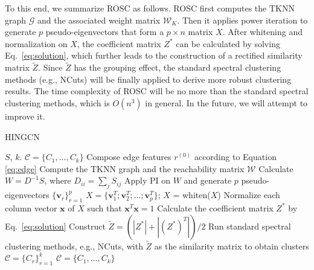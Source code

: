 To this end, we summarize ROSC as follows.
ROSC first computes the TKNN graph $\mathcal{G}$
and the associated weight matrix $\mathcal{W}_K$. Then it applies power iteration to generate $p$
pseudo-eigenvectors that form a $p \times n$ matrix $X$.
After whitening and normalization on $X$,
the coefficient matrix $Z^*$ can be calculated by solving Eq.~\ref{eq:solution},
which further leads to the construction of a rectified similarity matrix $\tilde{Z}$.
Since $\tilde{Z}$ has the grouping effect, 
the standard spectral clustering methods (e.g., NCuts) will be finally applied to derive more robust clustering results.
The time complexity of ROSC will be no more than the standard spectral clustering methods,
which is $O(n^3)$ in general.
In the future, we will attempt to improve it. 


\begin{algorithm}
\begin{small}
\caption{HINGCN}
\label{alg}
\begin{algorithmic}[1]
\Require $S$, $k$.
\Ensure $\mathcal{C} = \{C_1, ..., C_k\}$
\State Compose edge features $r^{(0)}$ according to Equation \ref{eq:edge}
\State Compute the TKNN graph and the reachability matrix $\mathcal{W}$
\State Calculate $W = D^{-1}S$, where $D_{ii} = \sum_jS_{ij}$
\State Apply PI on $W$ and generate $p$ pseudo-eigenvectors $\{\bm{v}_r\}_{r=1}^p$
\State $X = \{\bm{v}_1^T; \bm{v}_2^T; ...; \bm{v}_p^T\}$; $X$ = whiten($X$)
\State Normalize each column vector $\bm{x}$ of $X$ such that $\bm{x}^T\bm{x} = 1$
\State Calculate the coefficient matrix $Z^*$ by Eq.~\ref{eq:solution}
\State Construct $\tilde{Z} = (|Z^*| + |(Z^*)^T|)/2$
\State Run standard spectral clustering methods, e.g., NCuts, with $\tilde{Z}$ as the
similarity matrix to obtain clusters $\mathcal{C} = \{C_r\}_{r=1}^k$
\State \Return $\mathcal{C} = \{C_1, ..., C_k\}$
\end{algorithmic}
\end{small}
\end{algorithm}









